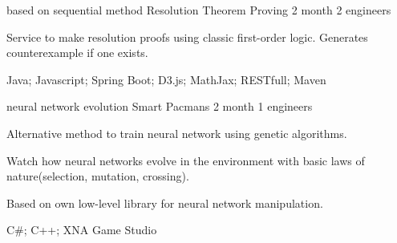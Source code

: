
\begin{cventries}


  \cventry
    {based on sequential method}
    {Resolution Theorem Proving}
    {2 month}
    {2 engineers}
    {
      \begin{cvitems}
        \item {Service to make resolution proofs using classic first-order logic. Generates counterexample if one exists.}
        \item {Java; Javascript; Spring Boot; D3.js; MathJax; RESTfull; Maven}
      \end{cvitems}
    }
  \cventry
    {neural network evolution}
    {Smart Pacmans}
    {2 month}
    {1 engineers}
    {
      \begin{cvitems}
        \item {Alternative method to train neural network using genetic algorithms.}
        \item {Watch how neural networks evolve in the environment with basic laws of nature(selection, mutation, crossing).}
        \item {Based on own low-level library for neural network manipulation.}
        \item {C\#; C++; XNA Game Studio}
      \end{cvitems}
    }
\end{cventries}
